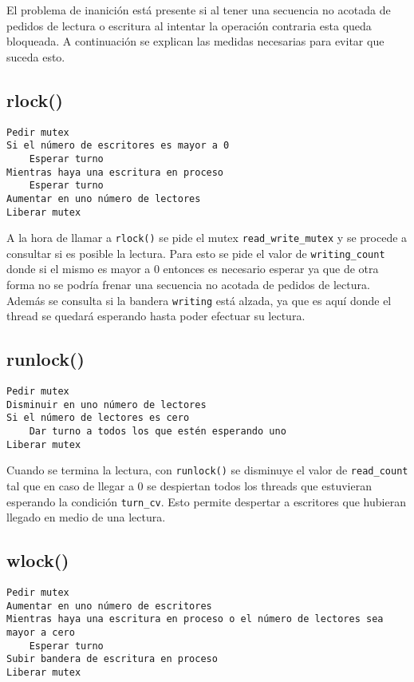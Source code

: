 \documentclass[a4paper]{article}
\begin{document}
El problema de inanición está presente si al tener una secuencia no acotada
de pedidos de lectura o escritura al intentar la operación contraria esta queda
bloqueada. A continuación se explican las medidas necesarias para evitar que
suceda esto.

\subsection*{rlock()}
\begin{codesnippet}
\begin{verbatim}
Pedir mutex
Si el número de escritores es mayor a 0
    Esperar turno
Mientras haya una escritura en proceso
    Esperar turno
Aumentar en uno número de lectores
Liberar mutex
\end{verbatim}
\end{codesnippet}

A la hora de llamar a \texttt{rlock()} se pide el mutex
\texttt{read\_write\_mutex} y se procede a consultar si es posible la lectura.
Para esto se pide el valor de \texttt{writing\_count} donde si el mismo es mayor
a 0 entonces es necesario esperar ya que de otra forma no se podría frenar una
secuencia no acotada de pedidos de lectura. Además se consulta si la bandera
\texttt{writing} está alzada, ya que es aquí donde el thread se quedará
esperando hasta poder efectuar su lectura.

\subsection*{runlock()}
\begin{codesnippet}
\begin{verbatim}
Pedir mutex
Disminuir en uno número de lectores
Si el número de lectores es cero
    Dar turno a todos los que estén esperando uno
Liberar mutex
\end{verbatim}
\end{codesnippet}

Cuando se termina la lectura, con \texttt{runlock()} se disminuye el
valor de \texttt{read\_count} tal que en caso de llegar a 0 se despiertan
todos los threads que estuvieran esperando la condición \texttt{turn\_cv}. Esto
permite despertar a escritores que hubieran llegado en medio de una lectura.

\subsection*{wlock()}
\begin{codesnippet}
\begin{verbatim}
Pedir mutex
Aumentar en uno número de escritores
Mientras haya una escritura en proceso o el número de lectores sea mayor a cero
    Esperar turno
Subir bandera de escritura en proceso
Liberar mutex
\end{verbatim}
\end{codesnippet}
\end{document}

